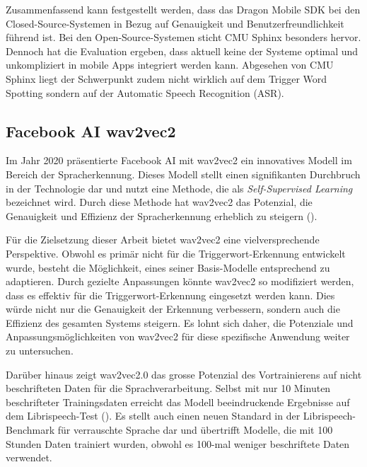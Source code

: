 \documentclass[11pt,a4paper]{article}
\begin{document}
\noindent \newline
Zusammenfassend kann festgestellt werden, dass das Dragon Mobile SDK bei den Closed-Source-Systemen 
in Bezug auf Genauigkeit und Benutzerfreundlichkeit führend ist. Bei den Open-Source-Systemen 
sticht CMU Sphinx besonders hervor. Dennoch hat die Evaluation ergeben, dass aktuell keine der 
Systeme optimal und unkompliziert in mobile Apps integriert werden kann. Abgesehen von CMU Sphinx 
liegt der Schwerpunkt zudem nicht wirklich auf dem Trigger Word Spotting sondern auf der
Automatic Speech Recognition (ASR).

\subsection{Facebook AI wav2vec2}

Im Jahr 2020 präsentierte Facebook AI mit wav2vec2 ein innovatives Modell im Bereich der 
Spracherkennung. Dieses Modell stellt einen signifikanten Durchbruch in der Technologie dar und 
nutzt eine Methode, die als \textit{Self-Supervised Learning} bezeichnet wird. Durch diese Methode 
hat wav2vec2 das Potenzial, die Genauigkeit und Effizienz der Spracherkennung erheblich zu steigern 
(\cite{baevski2020wav2vec}).

\noindent \newline
Für die Zielsetzung dieser Arbeit bietet wav2vec2 eine vielversprechende Perspektive. Obwohl es 
primär nicht für die Triggerwort-Erkennung entwickelt wurde, besteht die Möglichkeit, eines seiner 
Basis-Modelle entsprechend zu adaptieren. Durch gezielte Anpassungen könnte wav2vec2 so modifiziert 
werden, dass es effektiv für die Triggerwort-Erkennung eingesetzt werden kann. Dies würde nicht nur 
die Genauigkeit der Erkennung verbessern, sondern auch die Effizienz des gesamten Systems steigern. 
Es lohnt sich daher, die Potenziale und Anpassungsmöglichkeiten von wav2vec2 für diese spezifische 
Anwendung weiter zu untersuchen.

\noindent \newline
Darüber hinaus zeigt wav2vec2.0 das grosse Potenzial des Vortrainierens auf nicht beschrifteten 
Daten für die Sprachverarbeitung. Selbst mit nur 10 Minuten beschrifteter Trainingsdaten erreicht 
das Modell beeindruckende Ergebnisse auf dem Librispeech-Test (\cite{baevski2020wav2vec}). Es stellt 
auch einen neuen Standard in der Librispeech-Benchmark für verrauschte Sprache dar und übertrifft 
Modelle, die mit 100 Stunden Daten trainiert wurden, obwohl es 100-mal weniger beschriftete Daten 
verwendet.
\end{document}
